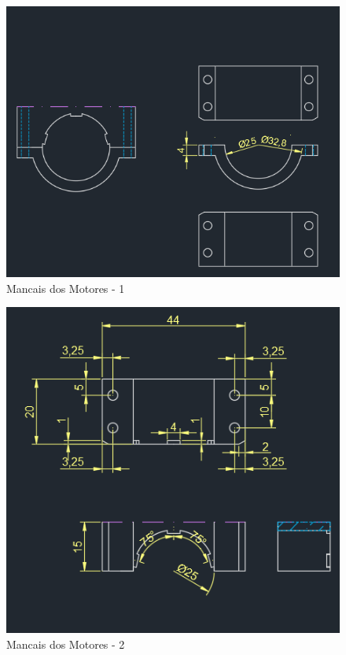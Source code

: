 \begin{figure}[h]
	\centering
	\includegraphics{figures/cad3}
	\caption{Mancais dos Motores - 1}
	\label{fig:mancais}
\end{figure}

\begin{figure}[h]
	\centering
	\includegraphics{figures/cad3_2}
	\caption{Mancais dos Motores - 2}
	\label{fig:mancais_2}
\end{figure}

